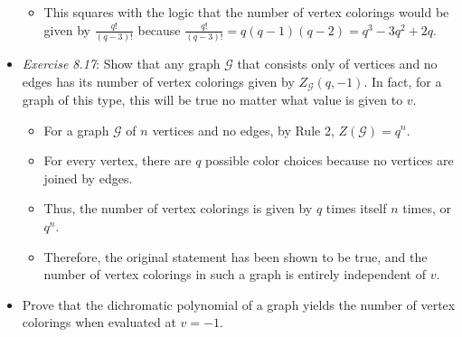 \documentclass[titlepage]{article}
\numberwithin{figure}{section}
\numberwithin{table}{section}
\numberwithin{equation}{section}
\begin{document}
\begin{itemize}
\begin{itemize}
        \item This squares with the logic that the number of vertex colorings would be given by $\frac{q!}{(q-3)!}$ because $\frac{q!}{(q-3)!}=q(q-1)(q-2)=q^3-3q^2+2q$.
    \end{itemize}
    \item \emph{Exercise 8.17}: Show that any graph $\mathcal{G}$ that consists only of vertices and no edges has its number of vertex colorings given by $Z_\mathcal{G}(q,-1)$. In fact, for a graph of this type, this will be true no matter what value is given to $v$.
    \begin{itemize}
        \item For a graph $\mathcal{G}$ of $n$ vertices and no edges, by Rule 2, $Z(\mathcal{G})=q^n$.
        \item For every vertex, there are $q$ possible color choices because no vertices are joined by edges.
        \item Thus, the number of vertex colorings is given by $q$ times itself $n$ times, or $q^n$.
        \item Therefore, the original statement has been shown to be true, and the number of vertex colorings in such a graph is entirely independent of $v$.
    \end{itemize}
    \item Prove that the dichromatic polynomial of a graph yields the number of vertex colorings when evaluated at $v=-1$.
\end{itemize}
\end{document}
